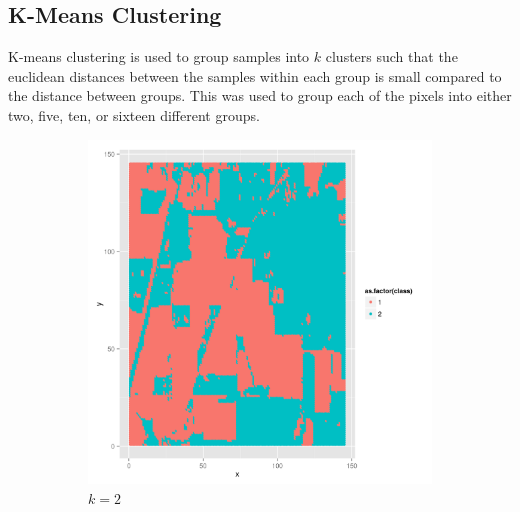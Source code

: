 \documentclass[10pt,letterpaper]{article}
\begin{document}
\subsection{K-Means Clustering}
K-means clustering is used to group samples into $k$ clusters such that the euclidean distances between the samples within each group is small compared to the distance between groups. This was used to group each of the pixels into either two, five, ten, or sixteen different groups.
\begin{figure}
\begin{center}
\begin{subfigure}[b]{0.24\textwidth}
\includegraphics[width=\textwidth]{../Presentation/km2.png}
\caption{$k=2$}
\end{subfigure}
\begin{subfigure}[b]{0.24\textwidth}

\end{subfigure}
\end{center}
\end{figure}
\end{document}
